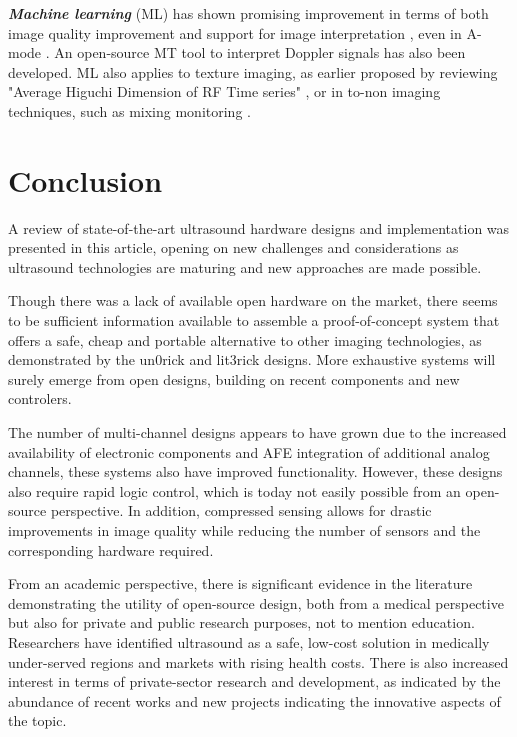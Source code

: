 \documentclass{article}
\begin{document}
\textbf{\textit{Machine learning}} (ML) has shown promising improvement in terms of both image quality improvement \cite{wang_high-resolution_2019, hewener_mobile_2019} and support for image interpretation \cite{divya_krishna_computer_2016}, even in A-mode \cite{brausch_classifying_2019}. An open-source MT tool to interpret Doppler signals \cite{dhutia_open-source_2017} has also been developed. ML also applies to texture imaging, as earlier proposed by reviewing "Average Higuchi Dimension of RF Time series" \cite{moradi_detection_2006}, or in to-non imaging techniques, such as mixing monitoring \cite{bowler_monitoring_2020}.


\newpage
\section{Conclusion}

A review of state-of-the-art ultrasound hardware designs and implementation was presented in this article, opening on new challenges and considerations as ultrasound technologies are maturing and new approaches are made possible.

Though there was a lack of available open hardware on the market, there seems to be sufficient information available to assemble a proof-of-concept system that offers a safe, cheap and portable alternative to other imaging technologies, as demonstrated by the un0rick and lit3rick designs. More exhaustive systems will surely emerge from open designs, building on recent components and new controlers.

The number of multi-channel designs appears to have grown due to the increased availability of electronic components and AFE integration of additional analog channels, these systems also have improved functionality. However, these designs also require rapid logic control, which is today not easily possible from an open-source perspective. In addition, compressed sensing allows for drastic improvements in image quality while reducing the number of sensors and the corresponding hardware required. 

From an academic perspective, there is significant evidence in the literature demonstrating the utility of open-source design, both from a medical perspective but also for private and public research purposes, not to mention education. Researchers have identified ultrasound as a safe, low-cost solution in medically under-served regions and markets with rising health costs. There is also increased interest in terms of private-sector research and development, as indicated by the abundance of recent works and new projects indicating the innovative aspects of the topic. 
\end{document}
